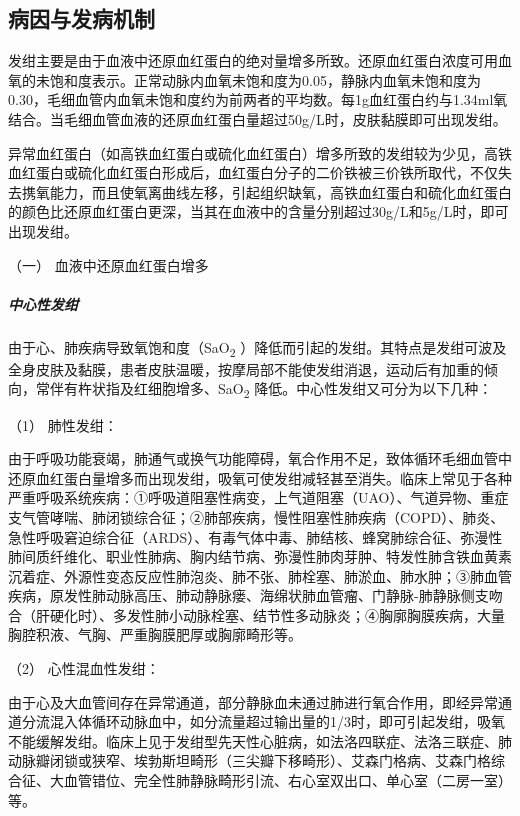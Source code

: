 \subsection{病因与发病机制}

发绀主要是由于血液中还原血红蛋白的绝对量增多所致。还原血红蛋白浓度可用血氧的未饱和度表示。正常动脉内血氧未饱和度为0.05，静脉内血氧未饱和度为0.30，毛细血管内血氧未饱和度约为前两者的平均数。每1g血红蛋白约与1.34ml氧结合。当毛细血管血液的还原血红蛋白量超过50g/L时，皮肤黏膜即可出现发绀。

异常血红蛋白（如高铁血红蛋白或硫化血红蛋白）增多所致的发绀较为少见，高铁血红蛋白或硫化血红蛋白形成后，血红蛋白分子的二价铁被三价铁所取代，不仅失去携氧能力，而且使氧离曲线左移，引起组织缺氧，高铁血红蛋白和硫化血红蛋白的颜色比还原血红蛋白更深，当其在血液中的含量分别超过30g/L和5g/L时，即可出现发绀。

\hypertarget{text00041.htmlux5cux23CHP1-17-1-1}{}
（一） 血液中还原血红蛋白增多

\subparagraph{中心性发绀}

由于心、肺疾病导致氧饱和度（SaO\textsubscript{2}
）降低而引起的发绀。其特点是发绀可波及全身皮肤及黏膜，患者皮肤温暖，按摩局部不能使发绀消退，运动后有加重的倾向，常伴有杵状指及红细胞增多、SaO\textsubscript{2}
降低。中心性发绀又可分为以下几种：

\hypertarget{text00041.htmlux5cux23CHP1-17-1-1-1-1}{}
（1） 肺性发绀：

由于呼吸功能衰竭，肺通气或换气功能障碍，氧合作用不足，致体循环毛细血管中还原血红蛋白量增多而出现发绀，吸氧可使发绀减轻甚至消失。临床上常见于各种严重呼吸系统疾病：①呼吸道阻塞性病变，上气道阻塞（UAO）、气道异物、重症支气管哮喘、肺闭锁综合征；②肺部疾病，慢性阻塞性肺疾病（COPD）、肺炎、急性呼吸窘迫综合征（ARDS）、有毒气体中毒、肺结核、蜂窝肺综合征、弥漫性肺间质纤维化、职业性肺病、胸内结节病、弥漫性肺肉芽肿、特发性肺含铁血黄素沉着症、外源性变态反应性肺泡炎、肺不张、肺栓塞、肺淤血、肺水肿；③肺血管疾病，原发性肺动脉高压、肺动静脉瘘、海绵状肺血管瘤、门静脉-肺静脉侧支吻合（肝硬化时）、多发性肺小动脉栓塞、结节性多动脉炎；④胸廓胸膜疾病，大量胸腔积液、气胸、严重胸膜肥厚或胸廓畸形等。

\hypertarget{text00041.htmlux5cux23CHP1-17-1-1-1-2}{}
（2） 心性混血性发绀：

由于心及大血管间存在异常通道，部分静脉血未通过肺进行氧合作用，即经异常通道分流混入体循环动脉血中，如分流量超过输出量的1/3时，即可引起发绀，吸氧不能缓解发绀。临床上见于发绀型先天性心脏病，如法洛四联症、法洛三联症、肺动脉瓣闭锁或狭窄、埃勃斯坦畸形（三尖瓣下移畸形）、艾森门格病、艾森门格综合征、大血管错位、完全性肺静脉畸形引流、右心室双出口、单心室（二房一室）等。

